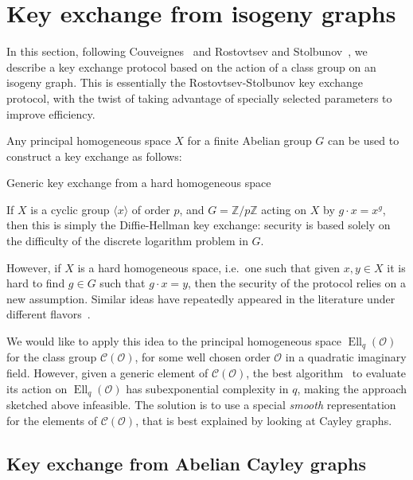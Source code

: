 \documentclass{article}
\newcommand{\Cl}{\mathcal{C}}
\renewcommand{\O}{\mathcal{O}}
\theoremstyle{definition}
\DeclareMathOperator{\Ell}{Ell}
\begin{document}
\section{Key exchange from isogeny graphs}
\label{sec:keyex}

In this section, following Couveignes~\cite{cryptoeprint:2006:291} and
Rostovtsev and Stolbunov~\cite{rostovtsev+stolbunov06}, we describe a
key exchange protocol based on the action of a class group on an
isogeny graph.  This is essentially the Rostovtsev-Stolbunov key
exchange protocol, with the twist of taking advantage of specially
selected parameters to improve efficiency.

Any principal homogeneous space $X$ for a finite Abelian group $G$ can
be used to construct a key exchange as follows:

\begin{algorithm}
  \caption{Generic key exchange from a hard homogeneous space}
  \label{proto:hhs}
\end{algorithm}

If $X$ is a cyclic group $〈x〉$ of order $p$, and $G=ℤ/pℤ$ acting on
$X$ by $g·x=x^g$, then this is simply the Diffie-Hellman key exchange:
security is based solely on the difficulty of the discrete logarithm
problem in $G$.

However, if $X$ is a hard homogeneous space, i.e.\ one such that given
$x,y∈X$ it is hard to find $g∈G$ such that $g·x=y$, then the security
of the protocol relies on a new assumption. Similar ideas have
repeatedly appeared in the literature under different
flavors~\cite{10.1007/3-540-44598-6_10,monico2007}.

We would like to apply this idea to the principal homogeneous space
$\Ell_q(\O)$ for the class group $\Cl(\O)$, for some well chosen order
$\O$ in a quadratic imaginary field. However, given a generic element
of $\Cl(\O)$, the best algorithm~\cite{jao+soukharev10} to evaluate
its action on $\Ell_q(\O)$ has subexponential complexity in $q$,
making the approach sketched above infeasible. The solution is to use
a special \emph{smooth} representation for the elements of $\Cl(\O)$,
that is best explained by looking at Cayley graphs.


\subsection{Key exchange from Abelian Cayley graphs}
\end{document}
